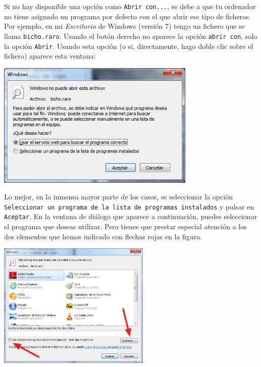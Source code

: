 \documentclass[10pt,a4paper]{article}\usepackage[]{graphicx}\usepackage[]{color}
\newcounter {cont01}
\begin{document}
Si no hay disponible una opción como {\tt Abrir con...}, se debe a que tu ordenador no tiene
asignado un programa por defecto con el que abrir ese tipo de ficheros. Por ejemplo, en mi {\em
Escritorio} de Windows (versión 7) tengo un fichero que se llama {\tt bicho.raro}. Usando el botón
derecho no aparece la opción {\tt abrir con}, solo la opción {\tt Abrir}. Usando esta opción (o si,
directamente, hago doble clic sobre el fichero) aparece esta ventana:
    \begin{center}
    \includegraphics[height=6cm]{../fig/Tut00-AbriendoBichoRaro.png}
    \end{center}
Lo mejor, en la inmensa mayor parte de los casos, es seleccionar la opción {\tt Seleccionar un
programa de la lista de programas instalados} y pulsar en {\tt Aceptar}. En la ventana de diálogo
que aparece a continuación, puedes seleccionar el programa que deseas utilizar. Pero tienes que
prestar especial atención a los dos elementos que hemos indicado con flechas rojas en la figura.

    \begin{center}
    \includegraphics[height=6cm]{../fig/Tut00-SeleccionandoProgramaPredeterminado.png}
    \end{center}
\end{document}
